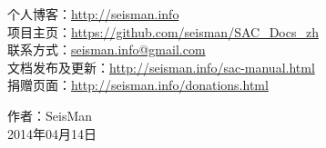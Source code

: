 \begin{flushleft}
个人博客：\url{http://seisman.info}                         \\
项目主页：\url{https://github.com/seisman/SAC_Docs_zh}      \\
联系方式：\url{seisman.info@gmail.com}                      \\
文档发布及更新：\url{http://seisman.info/sac-manual.html}   \\
捐赠页面：\url{http://seisman.info/donations.html}          \\
\end{flushleft}

\begin{flushright}
作者：SeisMan \\
2014年04月14日
\end{flushright}
